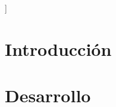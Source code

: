 \documentclass[a4paper,10pt,twocolumn]{article}
\begin{document}




\vspace{0.8cm}
]



\section{Introducción}\label{sec:intro}
 




\section{Desarrollo}\label{sec:dev}
 

\end{document}
